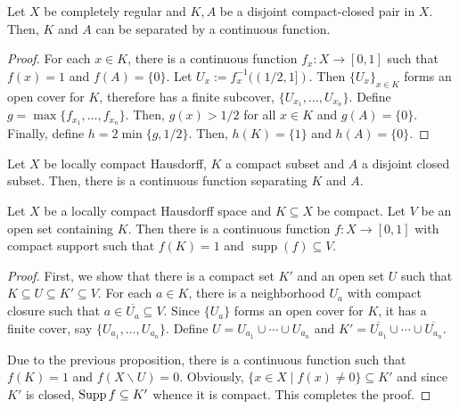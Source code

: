 \begin{proposition}
    Let $X$ be completely regular and $K,A$ be a disjoint compact-closed pair in $X$. Then, $K$ and $A$ can be separated by a continuous function.
\end{proposition}
\begin{proof}
    For each $x\in K$, there is a continuous function $f_x: X\to[0,1]$ such that $f(x) = 1$ and $f(A) = \{0\}$. Let $U_x := f_x^{-1}((1/2,1])$. Then $\{U_x\}_{x\in K}$ forms an open cover for $K$, therefore has a finite subcover, $\{U_{x_1},\ldots,U_{x_n}\}$. Define $g = \max\{f_{x_1},\ldots,f_{x_n}\}$. Then, $g(x) > 1/2$ for all $x\in K$ and $g(A) = \{0\}$. Finally, define $h = 2\min\{g, 1/2\}$. Then, $h(K) = \{1\}$ and $h(A) = \{0\}$.
\end{proof}
\begin{corollary}
    Let $X$ be locally compact Hausdorff, $K$ a compact subset and $A$ a disjoint closed subset. Then, there is a continuous function separating $K$ and $A$.
\end{corollary}

\begin{theorem}
    Let $X$ be a locally compact Hausdorff space and $K\subseteq X$ be compact. Let $V$ be an open set containing $K$. Then there is a continuous function $f: X\to[0,1]$ with compact support such that $f(K) = 1$ and $\operatorname{supp}(f)\subseteq V$.
\end{theorem}
\begin{proof}
    First, we show that there is a compact set $K'$ and an open set $U$ such that $K\subseteq U\subseteq K'\subseteq V$. For each $a\in K$, there is a neighborhood $U_a$ with compact closure such that $a\in\overline{U_a}\subseteq V$. Since $\{U_a\}$ forms an open cover for $K$, it has a finite cover, say $\{U_{a_1},\ldots,U_{a_n}\}$. Define $U = U_{a_1}\cup\cdots\cup U_{a_n}$ and $K' = \overline{U_{a_1}}\cup\cdots\cup\overline{U_{a_n}}$. 

    Due to the previous proposition, there is a continuous function such that $f(K) = 1$ and $f(X\backslash U) = 0$. Obviously, $\{x\in X\mid f(x)\ne 0\}\subseteq K'$ and since $K'$ is closed, $\operatorname{Supp} f\subseteq K'$ whence it is compact. This completes the proof.
\end{proof}

